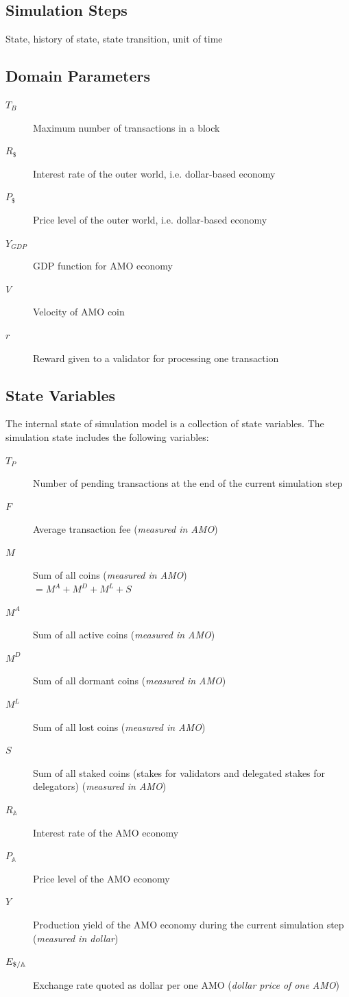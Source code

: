 \documentclass[a4paper,11pt]{scrartcl}
\newcommand{\usd}{\text{\textdollar}}
\newcommand{\amom}{\mathbb{A}}
\begin{document}
\subsection{Simulation Steps}
State, history of state, state transition, unit of time

\subsection{Domain Parameters}
\begin{description}
	\item[$T_B$] Maximum number of transactions in a block
	\item[$R_\$$] Interest rate of the outer world, i.e. dollar-based economy
	\item[$P_\$$] Price level of the outer world, i.e. dollar-based economy
	\item[$Y_{GDP}$] GDP function for AMO economy
	\item[$V$] Velocity of AMO coin
	\item[$r$] Reward given to a validator for processing one transaction
\end{description}

\subsection{State Variables}
The internal state of simulation model is a collection of state variables. The
simulation state includes the following variables:
\begin{description}
	\item[$T_P$] Number of pending transactions at the end of the current
		simulation step
	\item[$F$] Average transaction fee (\emph{measured in AMO})
	\item[$M$] Sum of all coins (\emph{measured in AMO}) \\
		$= M^A + M^D + M^L + S$
	\item[$M^A$] Sum of all active coins (\emph{measured in AMO})
	\item[$M^D$] Sum of all dormant coins (\emph{measured in AMO})
	\item[$M^L$] Sum of all lost coins (\emph{measured in AMO})
	\item[$S$] Sum of all staked coins (stakes for validators and
		delegated stakes for delegators) (\emph{measured in AMO})
	\item[$R_\amom$] Interest rate of the AMO economy
	\item[$P_\amom$] Price level of the AMO economy
	\item[$Y$] Production yield of the AMO economy during the current
		simulation step (\emph{measured in dollar})
	\item[$E_{\usd/\amom}$] Exchange rate quoted as dollar per one AMO
		(\emph{dollar price of one AMO})
\end{description}
\end{document}
